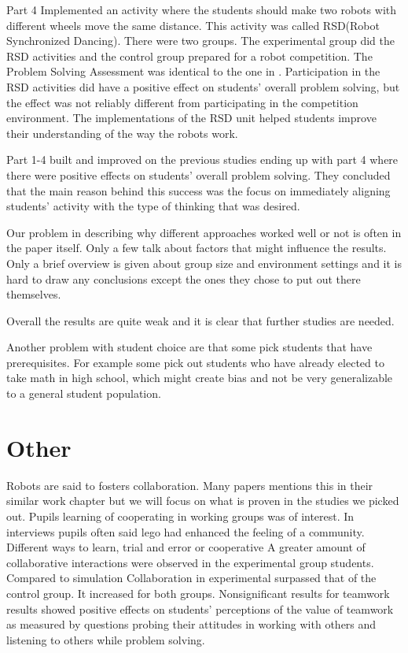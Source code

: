 \bigskip\noindent
Part 4 Implemented an activity where the students should make two robots with different wheels move the same distance. This activity was called RSD(Robot Synchronized Dancing). There were two groups. The experimental group did the RSD activities and the control group prepared for a robot competition. The Problem Solving Assessment was identical to the one in \cite{silk2011resources}. Participation in the RSD activities did have a positive effect on students' overall problem solving, but the effect was not reliably different from participating in the competition environment. The implementations of the RSD unit helped students improve their understanding of the way the robots work. 

\bigskip\noindent
Part 1-4 built and improved on the previous studies ending up with part 4 where there were positive effects on students' overall problem solving. They concluded that the main reason behind this success was the focus on immediately aligning students' activity with the type of thinking that was desired.

\bigskip\noindent
Our problem in describing why different approaches worked well or not is often in the paper itself. Only a few talk about factors that might influence the results. Only a brief overview is given about group size and environment settings and it is hard to draw any conclusions except the ones they chose to put out there themselves. 

\bigskip\noindent
Overall the results are quite weak and it is clear that further studies are needed.

\bigskip\noindent
Another problem with student choice are that some pick students that have prerequisites. For example some pick out students who have already elected to take math in high school, which might create bias and not be very generalizable to a general student population.

\section{Other}
Robots are said to fosters collaboration. Many papers mentions this in their similar work chapter but we will focus on what is proven in the studies we picked out.
\cite{lindh2007does} Pupils learning of cooperating in working groups was of interest. In interviews pupils often said lego had enhanced the feeling of a community. Different ways to learn, trial and error or cooperative
\cite{mitnik2009collaborative} A greater amount of collaborative interactions were observed in the experimental group students. Compared to simulation
\cite{mitnik2009collaborative} Collaboration in experimental surpassed that of the control group. It increased for both groups.
\cite{nugent2009use} Nonsignificant results for teamwork 
\cite{nugent2008effect} results showed positive effects on students' perceptions of the value of teamwork as measured by questions probing their attitudes in working with others and listening to others while problem solving. 

